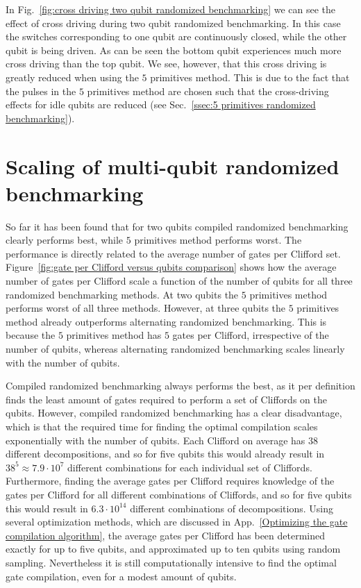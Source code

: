           In Fig.~\ref{fig:cross driving two qubit randomized benchmarking} we can see the effect of cross driving during two qubit randomized benchmarking. In this case the switches corresponding to one qubit are continuously closed, while the other qubit is being driven. As can be seen the bottom qubit experiences much more cross driving than the top qubit. We see, however, that this cross driving is greatly reduced when using the $5$ primitives method. This is due to the fact that the pulses in the $5$ primitives method are chosen such that the cross-driving effects for idle qubits are reduced (see Sec.~\ref{ssec:5 primitives randomized benchmarking}).

        \section{Scaling of multi-qubit randomized benchmarking}
          \label{sec:scaling of multi-qubit randomized benchmarking}


          So far it has been found that for two qubits compiled randomized benchmarking clearly performs best, while $5$ primitives method performs worst. The performance is directly related to the average number of gates per Clifford set. Figure~\ref{fig:gate per Clifford versus qubits comparison} shows how the average number of gates per Clifford scale a function of the number of qubits for all three randomized benchmarking methods. At two qubits the $5$ primitives method performs worst of all three methods. However, at three qubits the $5$ primitives method already outperforms alternating randomized benchmarking. This is because the $5$ primitives method has $5$ gates per Clifford, irrespective of the number of qubits, whereas alternating randomized benchmarking scales linearly with the number of qubits.

          Compiled randomized benchmarking always performs the best, as it per definition finds the least amount of gates required to perform a set of Cliffords on the qubits. However, compiled randomized benchmarking has a clear disadvantage, which is that the required time for finding the optimal compilation scales exponentially with the number of qubits. Each Clifford on average has $38$ different decompositions, and so for five qubits this would already result in $38^5\approx 7.9 \cdot 10^{7}$ different combinations for each individual set of Cliffords. Furthermore, finding the average gates per Clifford requires knowledge of the gates per Clifford for all different combinations of Cliffords, and so for five qubits this would result in $6.3\cdot10^{14}$ different combinations of decompositions. Using several optimization methods, which are discussed in App.~\ref{Optimizing the gate compilation algorithm}, the average gates per Clifford has been determined exactly for up to five qubits, and approximated up to ten qubits using random sampling. Nevertheless it is still computationally intensive to find the optimal gate compilation, even for a modest amount of qubits.


